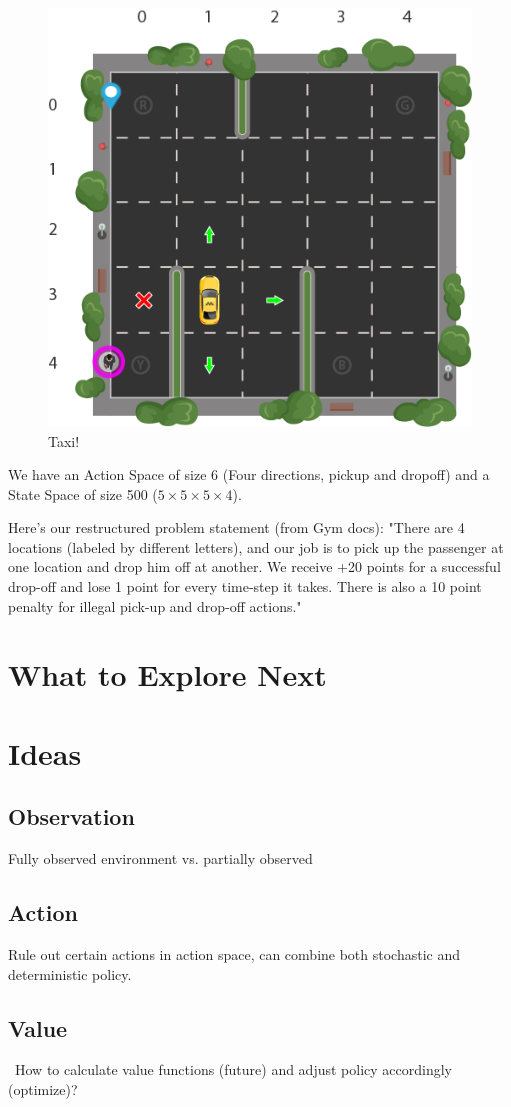 \documentclass{article}
\begin{document}
\begin{figure}[H]
  \includegraphics[width=\linewidth]{Reinforcement_Learning_Taxi_Env.width-1200.png}
  \caption{Taxi!}
  \label{fig:ag}
\end{figure}

We have an Action Space of size 6 (Four directions, pickup and dropoff) and a State Space of size 500 ($5 \times 5 \times 5 \times 4$).

Here's our restructured problem statement (from Gym docs):
"There are 4 locations (labeled by different letters), and our job is to pick up the passenger at one location and drop him off at another. We receive +20 points for a successful drop-off and lose 1 point for every time-step it takes. There is also a 10 point penalty for illegal pick-up and drop-off actions."


    
    
\section{What to Explore Next}
\section{Ideas}
    \subsection{Observation}
      Fully observed environment vs. partially observed\
    \subsection{Action}
      Rule out certain actions in action space, can combine both stochastic and deterministic policy.
    \subsection{Value}\
      How to calculate value functions (future) and adjust policy accordingly (optimize)? 
\end{document}
